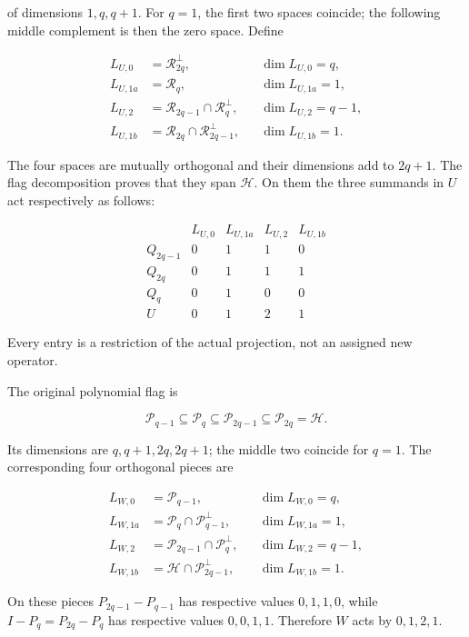 \documentclass{article}
\begin{document}
of dimensions \(1,q,q+1\). For \(q=1\), the first two spaces coincide; the following middle complement is then the zero space. Define

\[
\begin{aligned}
L_{U,0}&=\mathcal R_{2q}^{\perp},\qquad &&\dim L_{U,0}=q,\\
L_{U,1a}&=\mathcal R_q, &&\dim L_{U,1a}=1,\\
L_{U,2}&=\mathcal R_{2q-1}\cap\mathcal R_q^{\perp},
&&\dim L_{U,2}=q-1,\\
L_{U,1b}&=\mathcal R_{2q}\cap\mathcal R_{2q-1}^{\perp},
&&\dim L_{U,1b}=1.
\end{aligned}
\tag{WS6}
\]

The four spaces are mutually orthogonal and their dimensions add to \(2q+1\). The flag decomposition proves that they span \(\mathcal H\). On them the three summands in \(U\) act respectively as follows:

\[
\begin{array}{c|rrrr}
&L_{U,0}&L_{U,1a}&L_{U,2}&L_{U,1b}\\\hline
Q_{2q-1}&0&1&1&0\\
Q_{2q}&0&1&1&1\\
Q_q&0&1&0&0\\\hline
U&0&1&2&1
\end{array}
\tag{WS7}
\]

Every entry is a restriction of the actual projection, not an assigned new operator.

The original polynomial flag is

\[
\mathcal P_{q-1}\subseteq\mathcal P_q
\subseteq\mathcal P_{2q-1}\subseteq\mathcal P_{2q}=\mathcal H.
\tag{WS8}
\]

Its dimensions are \(q,q+1,2q,2q+1\); the middle two coincide for \(q=1\). The corresponding four orthogonal pieces are

\[
\begin{aligned}
L_{W,0}&=\mathcal P_{q-1},&&\dim L_{W,0}=q,\\
L_{W,1a}&=\mathcal P_q\cap\mathcal P_{q-1}^{\perp},
&&\dim L_{W,1a}=1,\\
L_{W,2}&=\mathcal P_{2q-1}\cap\mathcal P_q^{\perp},
&&\dim L_{W,2}=q-1,\\
L_{W,1b}&=\mathcal H\cap\mathcal P_{2q-1}^{\perp},
&&\dim L_{W,1b}=1.
\end{aligned}
\tag{WS9}
\]

On these pieces \(P_{2q-1}-P_{q-1}\) has respective values \(0,1,1,0\), while \(I-P_q=P_{2q}-P_q\) has respective values \(0,0,1,1\). Therefore \(W\) acts by \(0,1,2,1\).
\end{document}
